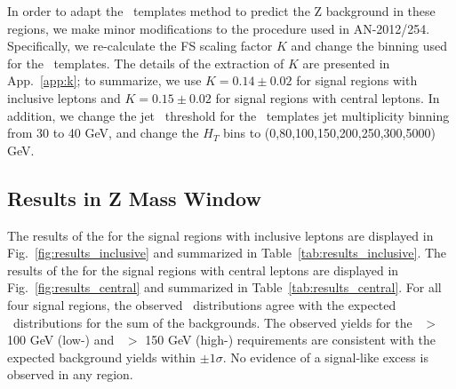 In order to adapt the \MET\ templates method to predict the Z background in these regions, we make minor modifications
to the procedure used in AN-2012/254. Specifically, we re-calculate
the FS scaling factor $K$ and change the binning used for the \MET\ templates.
The details of the extraction of $K$ are presented in App.~\ref{app:k}; to summarize, we use $K=0.14\pm0.02$ for 
signal regions with inclusive leptons and $K=0.15\pm0.02$ for signal regions with central leptons.
In addition, we change the jet \pt\ threshold for the \MET\ templates jet multiplicity binning from 30 to 40 GeV, and change the $H_T$ bins to
(0,80,100,150,200,250,300,5000) GeV.

\subsection{Results in Z Mass Window}

The results of the for the signal regions with inclusive leptons are displayed in Fig.~\ref{fig:results_inclusive} and summarized in Table~\ref{tab:results_inclusive}.
The results of the for the signal regions with central leptons are displayed in Fig.~\ref{fig:results_central} and summarized in Table~\ref{tab:results_central}.
For all four signal regions, the observed \MET\ distributions agree with the expected \MET\ distributions for the sum of the backgrounds.
The observed yields for the \MET\ $>$ 100 GeV (low-\MET) and \MET\ $>$ 150 GeV (high-\MET) requirements are consistent with the
expected background yields within $\pm1\sigma$. No evidence of a signal-like excess is observed in any region.


